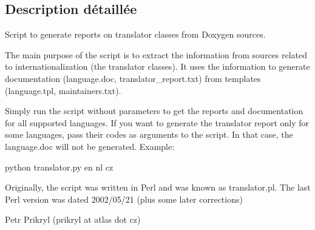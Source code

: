 \subsection{Description détaillée}
\begin{DoxyVerb}Script to generate reports on translator classes from Doxygen sources.

  The main purpose of the script is to extract the information from sources
  related to internationalization (the translator classes). It uses the
  information to generate documentation (language.doc,
  translator_report.txt) from templates (language.tpl, maintainers.txt).

  Simply run the script without parameters to get the reports and
  documentation for all supported languages. If you want to generate the
  translator report only for some languages, pass their codes as arguments
  to the script. In that case, the language.doc will not be generated.
  Example:

    python translator.py en nl cz

  Originally, the script was written in Perl and was known as translator.pl.
  The last Perl version was dated 2002/05/21 (plus some later corrections)

                                         Petr Prikryl (prikryl at atlas dot cz)


\end{DoxyVerb}
